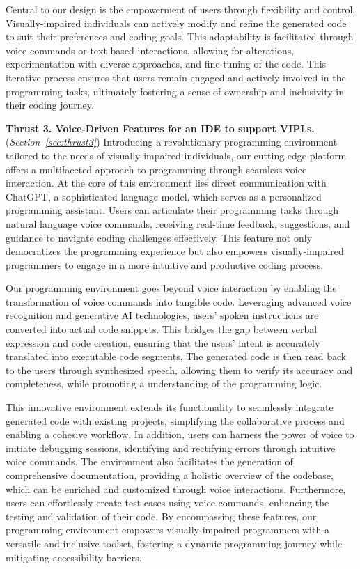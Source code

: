 Central to our design is the empowerment of users through flexibility
and control. Visually-impaired individuals can actively modify and
refine the generated code to suit their preferences and coding
goals. This adaptability is facilitated through voice commands or
text-based interactions, allowing for alterations, experimentation
with diverse approaches, and fine-tuning of the code. This iterative
process ensures that users remain engaged and actively involved in the
programming tasks, ultimately fostering a sense of ownership and
inclusivity in their coding journey.

\vspace{3pt}
\noindent \textbf{Thrust 3. Voice-Driven Features for an IDE to
  support VIPLs.} ({\em Section~\ref{sec:thrust3}}) Introducing a
revolutionary programming environment tailored to the needs of
visually-impaired individuals, our cutting-edge platform offers a
multifaceted approach to programming through seamless voice
interaction. At the core of this environment lies direct communication
with ChatGPT, a sophisticated language model, which serves as a
personalized programming assistant. Users can articulate their
programming tasks through natural language voice commands, receiving
real-time feedback, suggestions, and guidance to navigate coding
challenges effectively. This feature not only democratizes the
programming experience but also empowers visually-impaired programmers
to engage in a more intuitive and productive coding process.

Our programming environment goes beyond voice interaction by enabling
the transformation of voice commands into tangible code. Leveraging
advanced voice recognition and generative AI technologies, users'
spoken instructions are converted into actual code snippets. This
bridges the gap between verbal expression and code creation, ensuring
that the users' intent is accurately translated into executable code
segments. The generated code is then read back to the users through
synthesized speech, allowing them to verify its accuracy and
completeness, while promoting a understanding of the
programming logic.

This innovative environment extends its functionality to seamlessly
integrate generated code with existing projects, simplifying the
collaborative process and enabling a cohesive workflow. In addition,
users can harness the power of voice to initiate debugging sessions,
identifying and rectifying errors through intuitive voice
commands. The environment also facilitates the generation of
comprehensive documentation, providing a holistic overview of the
codebase, which can be enriched and customized through voice
interactions. Furthermore, users can effortlessly create test cases
using voice commands, enhancing the testing and validation of their
code. By encompassing these features, our programming environment
empowers visually-impaired programmers with a versatile and inclusive
toolset, fostering a dynamic programming journey while mitigating
accessibility barriers.



